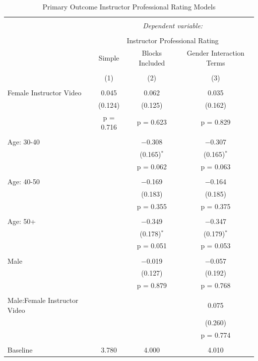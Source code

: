\documentclass[
]{article}
\begin{document}
\begin{table}[!htbp] \centering 
  \caption{Primary Outcome Instructor Professional Rating Models} 
  \label{} 
\small 
\begin{tabular}{@{\extracolsep{3pt}}lccc} 
\\[-1.8ex]\hline 
\hline \\[-1.8ex] 
 & \multicolumn{3}{c}{\textit{Dependent variable:}} \\ 
\cline{2-4} 
\\[-1.8ex] & \multicolumn{3}{c}{Instructor Professional Rating} \\ 
 & Simple & Blocks Included & Gender Interaction Terms \\ 
\\[-1.8ex] & (1) & (2) & (3)\\ 
\hline \\[-1.8ex] 
 Female Instructor Video & 0.045 & 0.062 & 0.035 \\ 
  & (0.124) & (0.125) & (0.162) \\ 
  & p = 0.716 & p = 0.623 & p = 0.829 \\ 
  & & & \\ 
 Age: 30-40 &  & $-$0.308 & $-$0.307 \\ 
  &  & (0.165)$^{*}$ & (0.165)$^{*}$ \\ 
  &  & p = 0.062 & p = 0.063 \\ 
  & & & \\ 
 Age: 40-50 &  & $-$0.169 & $-$0.164 \\ 
  &  & (0.183) & (0.185) \\ 
  &  & p = 0.355 & p = 0.375 \\ 
  & & & \\ 
 Age: 50+ &  & $-$0.349 & $-$0.347 \\ 
  &  & (0.178)$^{*}$ & (0.179)$^{*}$ \\ 
  &  & p = 0.051 & p = 0.053 \\ 
  & & & \\ 
 Male &  & $-$0.019 & $-$0.057 \\ 
  &  & (0.127) & (0.192) \\ 
  &  & p = 0.879 & p = 0.768 \\ 
  & & & \\ 
 Male:Female Instructor Video &  &  & 0.075 \\ 
  &  &  & (0.260) \\ 
  &  &  & p = 0.774 \\ 
  & & & \\ 
 Baseline & 3.780 & 4.000 & 4.010 \\ 

\end{tabular}
\end{table}
\end{document}
